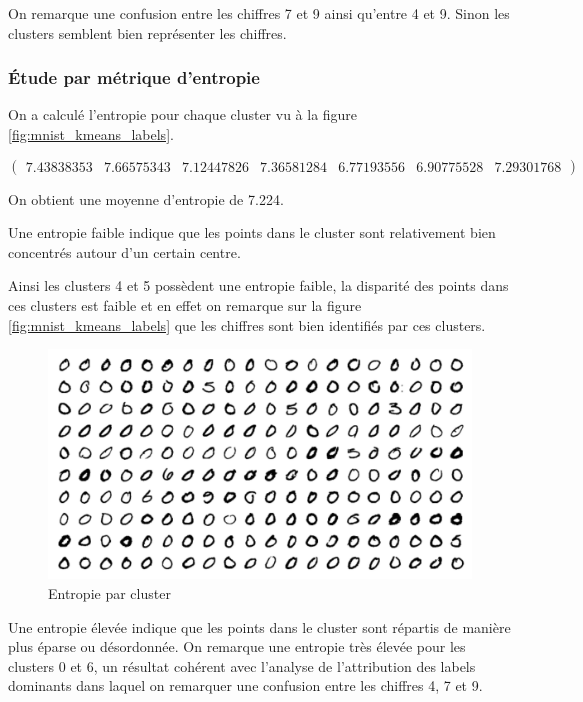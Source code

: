 \documentclass[french,a4paper,18pt]{article}
\begin{document}
On remarque une confusion entre les chiffres 7 et 9 ainsi qu'entre 4 et 9.
Sinon les clusters semblent bien représenter les chiffres.

\subsubsection{Étude par métrique d'entropie}

On a calculé l'entropie pour chaque cluster vu à la figure \ref{fig:mnist_kmeans_labels}.

\[
\begin{pmatrix}
    7.43838353 & 7.66575343 & 7.12447826 & 7.36581284 & 6.77193556 & 6.90775528 & 7.29301768
\end{pmatrix}
\]

On obtient une moyenne d'entropie de 7.224.

Une entropie faible indique que les points dans le cluster sont relativement bien concentrés autour d'un certain centre.

Ainsi les clusters 4 et 5 possèdent une entropie faible, la disparité des points dans ces clusters est faible
et en effet on remarque sur la figure \ref{fig:mnist_kmeans_labels} que les chiffres sont bien identifiés par ces clusters. 

\begin{figure}[h!]
    \centering
    \includegraphics[scale=0.3]{images/mnist_kmeans_low_entropy_cluster.png}
    \caption{Entropie par cluster}\label{fig:mnist_kmeans_entropy}
\end{figure}


Une entropie élevée indique que les points dans le cluster sont répartis de manière plus éparse ou désordonnée.
On remarque une entropie très élevée pour les clusters 0 et 6, un résultat cohérent 
avec l'analyse de l'attribution des labels dominants dans laquel on remarquer une confusion entre les chiffres 4, 7 et 9.
\end{document}

